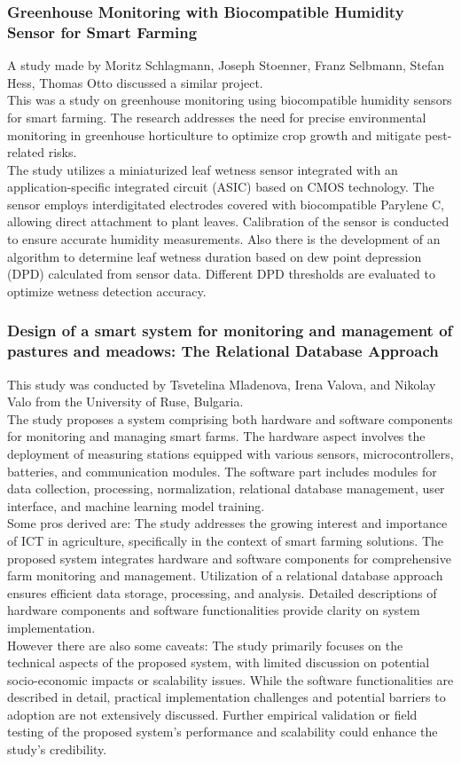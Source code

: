 \documentclass[12pt, a4paper]{article}
\begin{document}
\subsubsection{Greenhouse Monitoring with Biocompatible Humidity Sensor for Smart Farming}
A study made by Moritz Schlagmann, Joseph Stoenner, Franz Selbmann, Stefan Hess, Thomas Otto \cite{schlagmann2023greenhouse} discussed a similar project.\\
This was a study on greenhouse monitoring using biocompatible humidity sensors for smart farming. The research addresses the need for precise environmental monitoring in greenhouse horticulture to optimize crop growth and mitigate pest-related risks.\\
 The study utilizes a miniaturized leaf wetness sensor integrated with an application-specific integrated circuit (ASIC) based on CMOS technology. The sensor employs interdigitated electrodes covered with biocompatible Parylene C, allowing direct attachment to plant leaves. Calibration of the sensor is conducted to ensure accurate humidity measurements. Also there is the development of  an algorithm to determine leaf wetness duration based on dew point depression (DPD) calculated from sensor data. Different DPD thresholds are evaluated to optimize wetness detection accuracy.
 
 \subsubsection{Design of a smart system for monitoring and management of pastures and meadows: The Relational Database Approach}
This study was conducted by Tsvetelina Mladenova, Irena Valova, and Nikolay Valo \cite{mladenova2022design} from the University of Ruse, Bulgaria.\\
The study proposes a system comprising both hardware and software components for monitoring and managing smart farms. The hardware aspect involves the deployment of measuring stations equipped with various sensors, microcontrollers, batteries, and communication modules. The software part includes modules for data collection, processing, normalization, relational database management, user interface, and machine learning model training.\\
Some pros derived are: The study addresses the growing interest and importance of ICT in agriculture, specifically in the context of smart farming solutions. The proposed system integrates hardware and software components for comprehensive farm monitoring and management. Utilization of a relational database approach ensures efficient data storage, processing, and analysis. Detailed descriptions of hardware components and software functionalities provide clarity on system implementation.\\
However there are also some caveats: The study primarily focuses on the technical aspects of the proposed system, with limited discussion on potential socio-economic impacts or scalability issues. While the software functionalities are described in detail, practical implementation challenges and potential barriers to adoption are not extensively discussed. Further empirical validation or field testing of the proposed system's performance and scalability could enhance the study's credibility.
\end{document}
